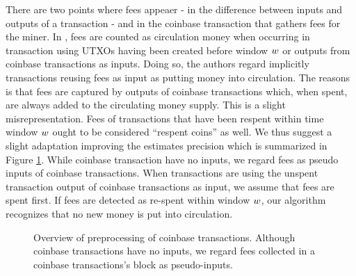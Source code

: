 There are two points where fees appeaer - in the difference between inputs and outputs of a transaction - and in the coinbase transaction that gathers fees for the miner. %
In \cite{pernice2019cryptocurrencies}, fees are counted as circulation money when occurring in transaction using UTXOs having been created before window \({w}\) or outputs from coinbase transactions as inputs. %
Doing so, the authors regard implicitly transactions reusing fees as input as putting money into circulation.  
The reasons is that fees are captured by outputs of coinbase transactions which, when spent, are always added to the circulating money supply. %
This is a slight misrepresentation. %
Fees of transactions that have been respent within time window \({w}\) ought to be considered ``respent coins'' as well. %
We thus suggest a slight adaptation improving the estimates precision which is summarized in Figure \ref{fig:improve_fees}. %
While coinbase transaction have no inputs, we regard fees as pseudo inputs of coinbase transactions. %
When transactions are using the unspent transaction output of coinbase transactions as input, we assume that fees are spent first. %
If fees are detected as re-spent within window \({w}\), our algorithm recognizes that no new money is put into circulation. %

\begin{figure}[t]
  \label{fig:improve_fees}%
	
	\centering
	\caption{Overview of preprocessing of coinbase transactions. Although coinbase transactions have no inputs, we regard fees collected in a coinbase transactions's block as pseudo-inputs.}
\end{figure}

